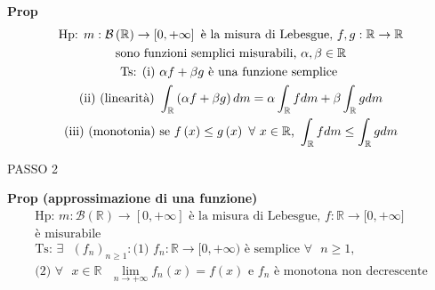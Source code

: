 \documentclass{article}
\begin{document}
\textbf{Prop}%
\begin{gather*}
\text{Hp: }m:\mathcal{B}\left( 
\mathbb{R}
\right) \rightarrow \left[ 0,+\infty \right] \text{ \`{e} la misura di
Lebesgue, }f,g:%
\mathbb{R}
\rightarrow 
\mathbb{R}
\\
\text{sono funzioni semplici misurabili, }\alpha ,\beta \in 
\mathbb{R}
\\
\text{Ts: (i) }\alpha f+\beta g\text{ \`{e} una funzione semplice } \\
\text{(ii) (linearit\`{a}) }\int_{%
\mathbb{R}
}\left( \alpha f+\beta g\right) dm=\alpha \int_{%
\mathbb{R}
}fdm+\beta \int_{%
\mathbb{R}
}gdm \\
\text{(iii) (monotonia) se }f\left( x\right) \leq g\left( x\right) \text{ }%
\forall \text{ }x\in 
\mathbb{R}
\text{, }\int_{%
\mathbb{R}
}fdm\leq \int_{%
\mathbb{R}
}gdm
\end{gather*}

PASSO 2

\textbf{Prop (approssimazione di una funzione)}%
\begin{gather*}
\text{Hp: }m:\mathcal{B}\left( 
\mathbb{R}
\right) \rightarrow \left[ 0,+\infty \right] \text{ \`{e} la misura di
Lebesgue, }f:%
\mathbb{R}
\rightarrow \lbrack 0,+\infty ] \\
\text{\`{e} misurabile} \\
\text{Ts: }\exists \text{ }\left( f_{n}\right) _{n\geq 1}:\text{(1) }f_{n}:%
\mathbb{R}
\rightarrow \lbrack 0,+\infty )\text{ \`{e} semplice }\forall \text{ }n\geq 1%
\text{,} \\
\text{(2) }\forall \text{ }x\in 
\mathbb{R}
\text{ }\lim_{n\rightarrow +\infty }f_{n}\left( x\right) =f\left( x\right) 
\text{ e }f_{n}\text{ \`{e} monotona non decrescente}
\end{gather*}
\end{document}
